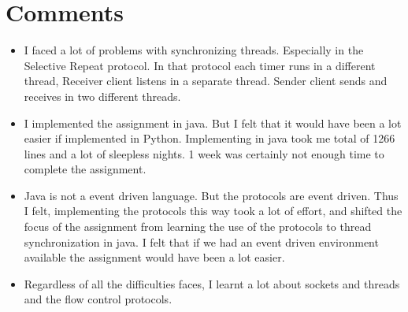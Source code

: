 \documentclass[14pt,titlepage, a4paper]{extarticle}
\begin{document}
\section{Comments}
\begin{itemize}
	\item I faced a lot of problems with synchronizing threads.
		Especially in the Selective Repeat protocol. In that protocol
		each timer runs in a different thread, Receiver client listens
		in a separate thread. Sender client sends and receives in two
		different threads.

	\item I implemented the assignment in java. But I felt that it would have
		been a lot easier if implemented in Python. Implementing in java
		took me total of 1266 lines and a lot of sleepless nights. 1 week
		was certainly not enough time to complete the assignment.
	
	\item Java is not a event driven language. But the protocols are event driven.
		Thus I felt, implementing the protocols this way took a lot of effort,
		and shifted the focus of the assignment from learning 
		the use of the protocols to thread synchronization in java. I felt
		that if we had an event driven environment available the assignment
		would have been a lot easier.
	
	\item Regardless of all the difficulties faces, I learnt a lot about sockets
		and threads and the flow control protocols. 
\end{itemize}
\end{document}
